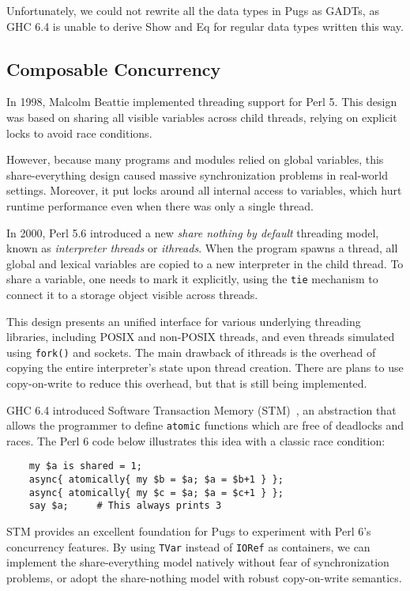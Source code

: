 \documentclass[]{sigplanconf}
\newcommand{\code}[1]{\texttt{#1}}
\begin{document}
Unfortunately, we could not rewrite all the data types in Pugs as GADTs, as GHC
6.4 is unable to derive Show and Eq for regular data types written this way.

\subsection{Composable Concurrency}
\label{sec:ComposableConcurrency}

In 1998, Malcolm Beattie implemented threading support for Perl 5.  This design
was based on sharing all visible variables across child threads, relying on
explicit locks to avoid race conditions.

However, because many programs and modules relied on global variables, this
share-everything design caused massive synchronization problems in real-world
settings.  Moreover, it put locks around all internal access to variables,
which hurt runtime performance even when there was only a single thread.

In 2000, Perl 5.6 introduced a new \emph{share nothing by default} threading
model, known as \emph{interpreter threads} or \emph{ithreads}.  When the
program spawns a thread, all global and lexical variables are copied to a new
interpreter in the child thread.  To share a variable, one needs to mark it
explicitly, using the \code{tie} mechanism to connect it to a storage object
visible across threads.

This design presents an unified interface for various underlying threading
libraries, including POSIX and non-POSIX threads, and even threads simulated
using \code{fork()} and sockets.  The main drawback of ithreads is the overhead
of copying the entire interpreter's state upon thread creation.  There are
plans to use copy-on-write to reduce this overhead, but that is still being
implemented.

GHC 6.4 introduced Software Transaction Memory (STM)~\cite{Harris}, an
abstraction that allows the programmer to define \code{atomic} functions which
are free of deadlocks and races.  The Perl 6 code below illustrates this idea
with a classic race condition:

\begin{lstlisting}
    my $a is shared = 1;
    async{ atomically{ my $b = $a; $a = $b+1 } };
    async{ atomically{ my $c = $a; $a = $c+1 } };
    say $a;     # This always prints 3
\end{lstlisting}

STM provides an excellent foundation for Pugs to experiment with Perl 6's
concurrency features.  By using \code{TVar} instead of \code{IORef} as
containers, we can implement the share-everything model natively without fear
of synchronization problems, or adopt the share-nothing model with robust
copy-on-write semantics.
\end{document}
